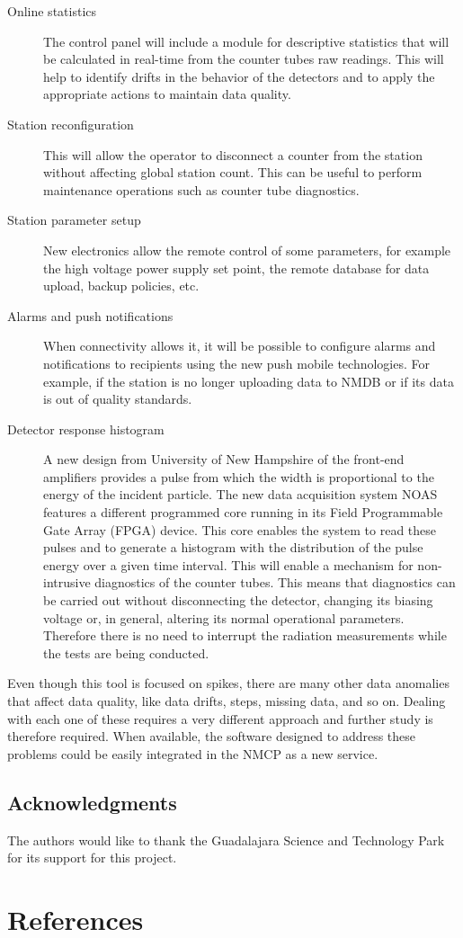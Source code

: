 \documentclass[a4paper]{jpconf}
\begin{document}
\begin{description}
    \item[Online statistics] The control panel will include a module for
        descriptive statistics that will be calculated in real-time from the
        counter tubes raw readings. This will help to identify drifts in the
        behavior of the detectors and to apply the appropriate actions to
        maintain data quality.
    \item[Station reconfiguration] This will allow the operator to disconnect a
        counter from the station without affecting global station count. This
        can be useful to perform maintenance operations such as counter tube
        diagnostics. 
    \item[Station parameter setup] New electronics allow the remote control of
        some parameters, for example the high voltage power supply set point,
        the remote database for data upload, backup policies, etc.
    \item[Alarms and push notifications] When connectivity allows it, it will
        be possible to configure alarms and notifications to recipients using
        the new push mobile technologies. For example, if the station is no
        longer uploading data to NMDB or if its data is out of quality
        standards.
    \item[Detector response histogram] A new design from University of New
        Hampshire of the front-end amplifiers provides a pulse from which the width is
        proportional to the energy of the incident particle. The new data
        acquisition system NOAS features a different programmed core running in
        its Field Programmable Gate Array (FPGA) device. This core enables the
        system to read these pulses and to generate a histogram with the
        distribution of the pulse energy over a given time interval. This will
        enable a mechanism for non-intrusive diagnostics of the counter tubes.
        This means that diagnostics can be carried out without disconnecting the
        detector, changing its biasing voltage or, in general, altering its
        normal operational parameters. Therefore there is no need to interrupt
        the radiation measurements while the tests are being conducted.
\end{description}

Even though this tool is focused on spikes, there are many other data anomalies
that affect data quality, like data drifts, steps, missing data, and so on.
Dealing with each one of these requires a very different approach and further
study is therefore required. When available, the software designed to address
these problems could be easily integrated in the NMCP as a new service.

\subsection*{Acknowledgments} 

The authors would like to thank the Guadalajara Science and Technology Park for
its support for this project.


\section*{References}
 
\end{document}

